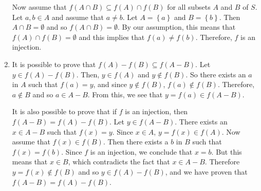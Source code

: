 \begin{enumerate}
Now assume that $f \left( A \cap B \right) \subseteq f \left( A \right) \cap f \left( B \right)$ for all subsets $A$ and $B$ of $S$.  Let $a, b \in A$ and assume that 
$a \ne b$.  Let $A = \left\{ a \right\}$ and $B = \left\{ b \right\}$.  Then 
$A \cap B = \emptyset$ and so $f \left( A \cap B \right) = \emptyset$.  By our assumption, this means that $f \left( A \right) \cap f \left( B \right) = \emptyset$ and this implies that 
$f \left( a \right) \ne f \left( b \right)$.  Therefore, $f$ is an injection.

\item It is possible to prove that 
$f \left( A \right) - f \left( B \right) \subseteq f \left( A - B \right)$.  Let \linebreak
$y \in f \left( A \right) - f \left( B \right)$.  Then, $y \in f \left( A \right)$ and 
$y \notin f \left( B \right)$.  So there exists an $a$ in $A$ such that $f \left( a \right) = y$, 
and since $y \notin f \left( B \right)$, $f \left( a \right) \notin f \left( B \right)$. Therefore, $a \notin B$ and so $a \in A - B$.  From this, we see that 
$y = f \left( a \right) \in f \left( A - B \right)$.

It is also possible to prove that if $f$ is an injection, then 
$f \left( A - B \right) = f \left( A \right) - f \left( B \right)$.  Let 
$y \in f \left( A - B \right)$.  There exists an $x \in A - B$ such that $f \left( x \right) = y$.  Since $x \in A$, $y = f \left( x \right) \in f \left( A \right)$.  Now assume that 
$f \left( x \right) \in f \left( B \right)$.  Then there exists a $b$ in $B$ such that 
$f \left( x \right) = f \left( b \right)$.  Since $f$ is an injection, we conclude that $x = b$.  But this means that $x \in B$, which contradicts the fact that $x \in A - B$.  Therefore 
$y = f \left( x \right) \notin f \left( B \right)$ and so 
$y \in f \left( A \right) - f \left( B \right)$, and we have proven that 
$f \left( A - B \right) = f \left( A \right) - f \left( B \right)$.

\hbreak
\end{enumerate}

\endinput
